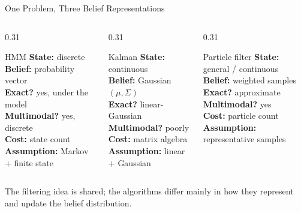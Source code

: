\documentclass[aspectratio=169,10pt]{beamer}
\begin{document}
\begin{frame}[shrink=10]{One Problem, Three Belief Representations}
  \begin{columns}[T,onlytextwidth]
    \begin{column}{0.31\textwidth}
      \begin{block}{HMM}
        \small
        \textbf{State:} discrete\\
        \textbf{Belief:} probability vector\\
        \textbf{Exact?} yes, under the model\\
        \textbf{Multimodal?} yes, discrete\\
        \textbf{Cost:} state count\\
        \textbf{Assumption:} Markov + finite state
      \end{block}
    \end{column}
    \begin{column}{0.31\textwidth}
      \begin{block}{Kalman}
        \small
        \textbf{State:} continuous\\
        \textbf{Belief:} Gaussian $(\mu,\Sigma)$\\
        \textbf{Exact?} linear-Gaussian\\
        \textbf{Multimodal?} poorly\\
        \textbf{Cost:} matrix algebra\\
        \textbf{Assumption:} linear + Gaussian
      \end{block}
    \end{column}
    \begin{column}{0.31\textwidth}
      \begin{block}{Particle filter}
        \small
        \textbf{State:} general / continuous\\
        \textbf{Belief:} weighted samples\\
        \textbf{Exact?} approximate\\
        \textbf{Multimodal?} yes\\
        \textbf{Cost:} particle count\\
        \textbf{Assumption:} representative samples
      \end{block}
    \end{column}
  \end{columns}

  \begin{keyidea}
    The filtering idea is shared; the algorithms differ mainly in how they represent and update the belief distribution.
  \end{keyidea}
\end{frame}
\end{document}
